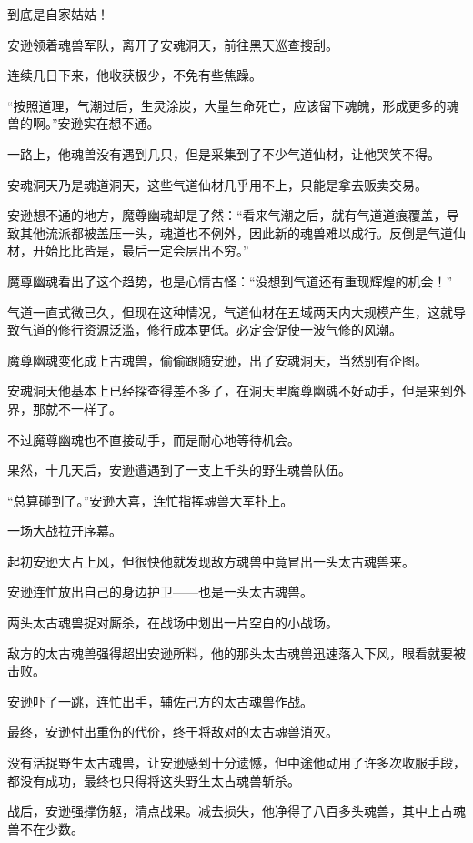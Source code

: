 \begin{this_body}
到底是自家姑姑！

安逊领着魂兽军队，离开了安魂洞天，前往黑天巡查搜刮。

连续几日下来，他收获极少，不免有些焦躁。

“按照道理，气潮过后，生灵涂炭，大量生命死亡，应该留下魂魄，形成更多的魂兽的啊。”安逊实在想不通。

一路上，他魂兽没有遇到几只，但是采集到了不少气道仙材，让他哭笑不得。

安魂洞天乃是魂道洞天，这些气道仙材几乎用不上，只能是拿去贩卖交易。

安逊想不通的地方，魔尊幽魂却是了然：“看来气潮之后，就有气道道痕覆盖，导致其他流派都被盖压一头，魂道也不例外，因此新的魂兽难以成行。反倒是气道仙材，开始比比皆是，最后一定会层出不穷。”

魔尊幽魂看出了这个趋势，也是心情古怪：“没想到气道还有重现辉煌的机会！”

气道一直式微已久，但现在这种情况，气道仙材在五域两天内大规模产生，这就导致气道的修行资源泛滥，修行成本更低。必定会促使一波气修的风潮。

魔尊幽魂变化成上古魂兽，偷偷跟随安逊，出了安魂洞天，当然别有企图。

安魂洞天他基本上已经探查得差不多了，在洞天里魔尊幽魂不好动手，但是来到外界，那就不一样了。

不过魔尊幽魂也不直接动手，而是耐心地等待机会。

果然，十几天后，安逊遭遇到了一支上千头的野生魂兽队伍。

“总算碰到了。”安逊大喜，连忙指挥魂兽大军扑上。

一场大战拉开序幕。

起初安逊大占上风，但很快他就发现敌方魂兽中竟冒出一头太古魂兽来。

安逊连忙放出自己的身边护卫——也是一头太古魂兽。

两头太古魂兽捉对厮杀，在战场中划出一片空白的小战场。

敌方的太古魂兽强得超出安逊所料，他的那头太古魂兽迅速落入下风，眼看就要被击败。

安逊吓了一跳，连忙出手，辅佐己方的太古魂兽作战。

最终，安逊付出重伤的代价，终于将敌对的太古魂兽消灭。

没有活捉野生太古魂兽，让安逊感到十分遗憾，但中途他动用了许多次收服手段，都没有成功，最终也只得将这头野生太古魂兽斩杀。

战后，安逊强撑伤躯，清点战果。减去损失，他净得了八百多头魂兽，其中上古魂兽不在少数。


\end{this_body}

